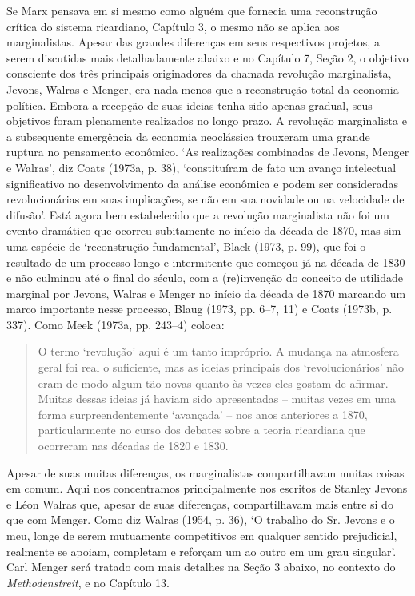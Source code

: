 \documentclass[12pt]{article}
\begin{document}
Se Marx pensava em si mesmo como alguém que fornecia uma reconstrução crítica do sistema ricardiano, Capítulo 3, o mesmo não se aplica aos marginalistas. Apesar das grandes diferenças em seus respectivos projetos, a serem discutidas mais detalhadamente abaixo e no Capítulo 7, Seção 2, o objetivo consciente dos três principais originadores da chamada revolução marginalista, Jevons, Walras e Menger, era nada menos que a reconstrução total da economia política. Embora a recepção de suas ideias tenha sido apenas gradual, seus objetivos foram plenamente realizados no longo prazo. A revolução marginalista e a subsequente emergência da economia neoclássica trouxeram uma grande ruptura no pensamento econômico. ‘As realizações combinadas de Jevons, Menger e Walras’, diz Coats (1973a, p. 38), ‘constituíram de fato um avanço intelectual significativo no desenvolvimento da análise econômica e podem ser consideradas revolucionárias em suas implicações, se não em sua novidade ou na velocidade de difusão’. Está agora bem estabelecido que a revolução marginalista não foi um evento dramático que ocorreu subitamente no início da década de 1870, mas sim uma espécie de ‘reconstrução fundamental’, Black (1973, p. 99), que foi o resultado de um processo longo e intermitente que começou já na década de 1830 e não culminou até o final do século, com a (re)invenção do conceito de utilidade marginal por Jevons, Walras e Menger no início da década de 1870 marcando um marco importante nesse processo, Blaug (1973, pp. 6–7, 11) e Coats (1973b, p. 337). Como Meek (1973a, pp. 243–4) coloca:

\begin{quote}
O termo ‘revolução’ aqui é um tanto impróprio. A mudança na atmosfera geral foi real o suficiente, mas as ideias principais dos ‘revolucionários’ não eram de modo algum tão novas quanto às vezes eles gostam de afirmar. Muitas dessas ideias já haviam sido apresentadas – muitas vezes em uma forma surpreendentemente ‘avançada’ – nos anos anteriores a 1870, particularmente no curso dos debates sobre a teoria ricardiana que ocorreram nas décadas de 1820 e 1830.
\end{quote}

Apesar de suas muitas diferenças, os marginalistas compartilhavam muitas coisas em comum. Aqui nos concentramos principalmente nos escritos de Stanley Jevons e Léon Walras que, apesar de suas diferenças, compartilhavam mais entre si do que com Menger. Como diz Walras (1954, p. 36), ‘O trabalho do Sr. Jevons e o meu, longe de serem mutuamente competitivos em qualquer sentido prejudicial, realmente se apoiam, completam e reforçam um ao outro em um grau singular’. Carl Menger será tratado com mais detalhes na Seção 3 abaixo, no contexto do \textit{Methodenstreit}, e no Capítulo 13.
\end{document}
